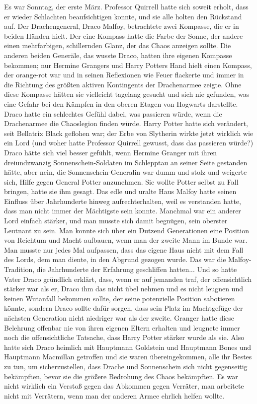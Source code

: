 Es war Sonntag, der erste März. Professor Quirrell hatte sich soweit erholt,
dass er wieder Schlachten beaufsichtigen konnte, und sie alle holten den
Rückstand auf. Der Drachengeneral, Draco Malfoy, betrachtete zwei Kompasse, die
er in beiden Händen hielt. Der eine Kompass hatte die Farbe der Sonne, der
andere einen mehrfarbigen, schillernden Glanz, der das Chaos anzeigen sollte.
Die anderen beiden Generäle, das wusste Draco, hatten ihre eigenen Kompasse
bekommen; nur Hermine Grangers und Harry Potters Hand hielt einen Kompass, der
orange-rot war und in seinen Reflexionen wie Feuer flackerte und immer in die
Richtung des größten aktiven Kontingents der Drachenarmee zeigte. Ohne diese
Kompasse hätten sie vielleicht tagelang gesucht und sich nie gefunden, was eine
Gefahr bei den Kämpfen in den oberen Etagen von Hogwarts darstellte. Draco hatte
ein schlechtes Gefühl dabei, was passieren würde, wenn die Drachenarmee die
Chaoslegion finden würde. Harry Potter hatte sich verändert, seit Bellatrix
Black geflohen war; der Erbe von Slytherin wirkte jetzt wirklich wie ein Lord
(und woher hatte Professor Quirrell gewusst, dass das passieren würde?) Draco
hätte sich viel besser gefühlt, wenn Hermine Granger mit ihren dreiundzwanzig
Sonnenschein-Soldaten im Schlepptau an seiner Seite gestanden hätte, aber nein,
die Sonnenschein-Generalin war dumm und stolz und weigerte sich, Hilfe gegen
General Potter anzunehmen. Sie wollte Potter selbst zu Fall bringen, hatte sie
ihm gesagt. Das edle und uralte Haus Malfoy hatte seinen Einfluss über
Jahrhunderte hinweg aufrechterhalten, weil es verstanden hatte, dass man nicht
immer der Mächtigste sein konnte. Manchmal war ein anderer Lord einfach stärker,
und man musste sich damit begnügen, sein oberster Leutnant zu sein. Man konnte
sich über ein Dutzend Generationen eine Position von Reichtum und Macht
aufbauen, wenn man der zweite Mann im Bunde war. Man musste nur jedes Mal
aufpassen, dass das eigene Haus nicht mit dem Fall des Lords, dem man diente, in
den Abgrund gezogen wurde. Das war die Malfoy-Tradition, die Jahrhunderte der
Erfahrung geschliffen hatten... Und so hatte Vater Draco gründlich erklärt,
dass, wenn er auf jemanden traf, der offensichtlich stärker war als er, Draco
ihm das nicht übel nehmen und es nicht leugnen und keinen Wutanfall bekommen
sollte, der seine potenzielle Position sabotieren könnte, sondern Draco sollte
dafür sorgen, dass sein Platz im Machtgefüge der nächsten Generation nicht
niedriger war als der zweite. Granger hatte diese Belehrung offenbar nie von
ihren eigenen Eltern erhalten und leugnete immer noch die offensichtliche
Tatsache, dass Harry Potter stärker wurde als sie. Also hatte sich Draco
heimlich mit Hauptmann Goldstein und Hauptmann Bones und Hauptmann Macmillan
getroffen und sie waren übereingekommen, alle ihr Bestes zu tun, um
sicherzustellen, dass Drache und Sonnenschein sich nicht gegenseitig bekämpften,
bevor sie die größere Bedrohung des Chaos bekämpften. Es war nicht wirklich ein
Verstoß gegen das Abkommen gegen Verräter, man arbeitete nicht mit Verrätern,
wenn man der anderen Armee ehrlich helfen wollte.

